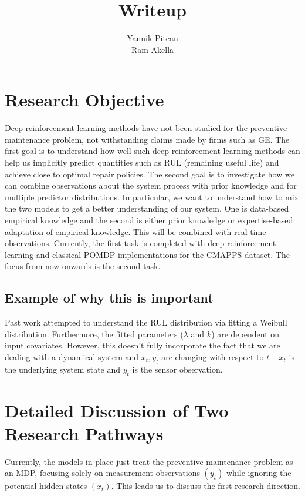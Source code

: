 \documentclass[english]{article}
\numberwithin{equation}{section}
\begin{document}
	
	\title{Writeup}
	
	\author{Yannik Pitcan \\
		Ram Akella
	}
	\maketitle

\section*{Research Objective}
Deep reinforcement learning methods have not been studied for the preventive maintenance problem, not withstanding claims made by firms such as GE. The first goal is to understand how well such deep reinforcement learning methods can help us implicitly predict quantities such as RUL (remaining useful life) and achieve close to optimal repair policies. The second goal is to investigate how we can combine observations about the system process with prior knowledge and for multiple predictor distributions. In particular, we want to understand how to mix the two models to get a better understanding of our system. One is data-based empirical knowledge and the second is either prior knowledge or expertise-based adaptation of empirical knowledge. This will be combined with real-time observations. Currently, the first task is completed with deep reinforcement learning and classical POMDP implementations for the CMAPPS dataset. The focus from now onwards is the second task.

\subsection*{Example of why this is important}
Past work attempted to understand the RUL distribution via fitting a Weibull distribution. Furthermore, the fitted parameters ($\lambda$ and $k$) are dependent on input covariates.  However, this doesn't fully incorporate the fact that we are dealing with a dynamical system and $x_t,y_t$ are changing with respect to $t$ -- $x_t$ is the underlying system state and $y_t$ is the sensor observation.

\section*{Detailed Discussion of Two Research Pathways}
Currently, the models in place just treat the preventive maintenance problem as an MDP, focusing solely on measurement observations $(y_t)$ while ignoring the potential hidden states $(x_t)$. This leads us to discuss the first research direction.
\end{document}
